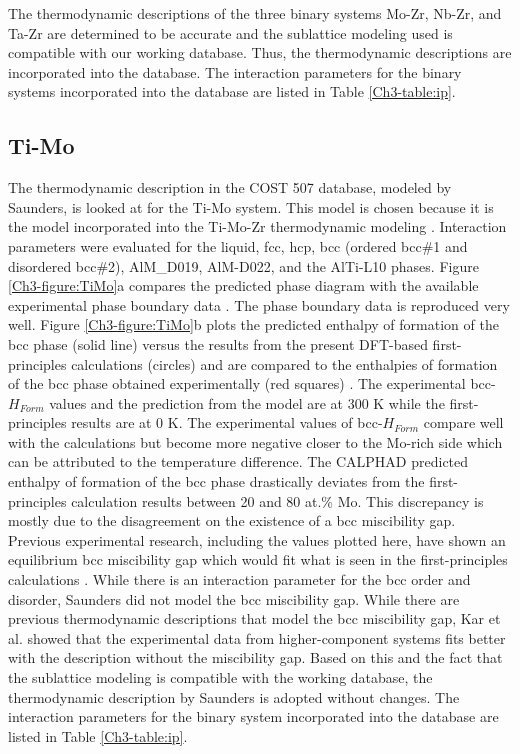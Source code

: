 The thermodynamic descriptions of the three binary systems Mo-Zr, Nb-Zr, and Ta-Zr are determined to be accurate and the sublattice modeling used is compatible with our working database. Thus, the thermodynamic descriptions are incorporated into the database. The interaction parameters for the binary systems incorporated into the database are listed in Table \ref{Ch3-table:ip}. 

\subsection{Ti-Mo}

The thermodynamic description in the COST 507 database, modeled by Saunders, \cite{Ansara1998} is looked at for the Ti-Mo system. This model is chosen because it is the model incorporated into the Ti-Mo-Zr thermodynamic modeling \cite{Kar2008}. Interaction parameters were evaluated for the liquid, fcc, hcp, bcc (ordered bcc\#1 and disordered bcc\#2), AlM\_D019, AlM-D022, and the AlTi-L10 phases. Figure \ref{Ch3-figure:TiMo}a compares the predicted phase diagram \cite{Ansara1998} with the available experimental phase boundary data \cite{Murray1981}. The phase boundary data is reproduced very well. Figure \ref{Ch3-figure:TiMo}b plots the predicted enthalpy of formation of the bcc phase (solid line) versus the results from the present DFT-based first-principles calculations (circles) and are compared to the enthalpies of formation of the bcc phase obtained experimentally (red squares) \cite{Uesugi2013}. The experimental bcc-$H_{Form}$ values and the prediction from the model are at 300 K while the first-principles results are at 0 K. The experimental values of bcc-$H_{Form}$ compare well with the calculations but become more negative closer to the Mo-rich side which can be attributed to the temperature difference. The CALPHAD predicted enthalpy of formation of the bcc phase drastically deviates from the first-principles calculation results between 20 and 80 at.\% Mo. This discrepancy is mostly due to the disagreement on the existence of a bcc miscibility gap. Previous experimental research, including the values plotted here, have shown an equilibrium bcc miscibility gap which would fit what is seen in the first-principles calculations \cite{Uesugi2013,Predel1997,Hoffman1967}. While there is an interaction parameter for the bcc order and disorder, Saunders \cite{Ansara1998} did not model the bcc miscibility gap. While there are previous thermodynamic descriptions that model the bcc miscibility gap, Kar et al. \cite{Kar2008} showed that the experimental data from higher-component systems fits better with the description without the miscibility gap. Based on this and the fact that the sublattice modeling is compatible with the working database, the thermodynamic description by Saunders \cite{Ansara1998} is adopted without changes. The interaction parameters for the binary system incorporated into the database are listed in Table \ref{Ch3-table:ip}.


